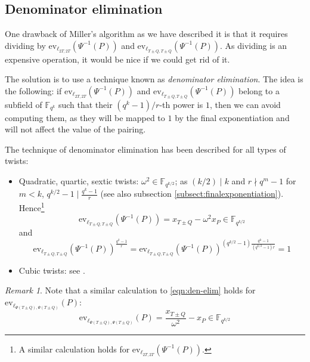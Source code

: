\documentclass{article}
\newcommand{\ev}{\mathrm{ev}}
\newcommand{\fq}[1]{\mathbb{F}_{q^{#1}}}
\theoremstyle{remark}
\newtheorem{remark}{Remark}[section]
\theoremstyle{plain}
\begin{document}
\subsection{Denominator elimination}

One drawback of Miller's algorithm as we have described it is that it requires dividing by $\ev_{\ell_{2T, 2T}}(\Psi^{-1}(P))$ and $\ev_{\ell_{T \pm Q, T \pm Q}}(\Psi^{-1}(P))$.
As dividing is an expensive operation, it would be nice if we could get rid of it.

The solution is to use a technique known as \emph{denominator elimination}.
The idea is the following: if $\ev_{\ell_{2T, 2T}}(\Psi^{-1}(P))$ and $\ev_{\ell_{T \pm Q, T \pm Q}}(\Psi^{-1}(P))$ belong to a subfield of $\fq{k}$ such that their $(q^k - 1)/r$-th power is $1$, then we can avoid computing them, as they will be mapped to $1$ by the final exponentiation and will not affect the value of the pairing.

The technique of denominator elimination has been described for all types of twists:
\begin{itemize}
    \item Quadratic, quartic, sextic twists: $\omega^2 \in \fq{k/2}$; as $(k/2) \mid k$ and $r \nmid q^m - 1$ for $m < k$, $q^{k/2} - 1 \mid \frac{q^k - 1}{r}$ (see also subsection \ref{subsect:finalexponentiation}). Hence\footnote{A similar calculation holds for $\ev_{\ell_{2T,2T}}(\Psi^{-1}(P))$.}
    \begin{equation}
        \label{eqn:den-elim}
        \ev_{\ell_{T \pm Q, T \pm Q}}(\Psi^{-1}(P)) = x_{T \pm Q} - \omega^2 x_P \in \fq{k/2}
    \end{equation}
    and
    \[
        \ev_{\ell_{T \pm Q, T \pm Q}}(\Psi^{-1}(P))^{\frac{q^k-1}{r}} = \ev_{\ell_{T \pm Q, T \pm Q}}(\Psi^{-1}(P))^{(q^{k/2}-1)\frac{q^k-1}{(q^{k/2}-1)r}} = 1
    \]
    \item Cubic twists: see \cite[Lem. 1]{LZZW-cubic-den-elim}.
\end{itemize}

\begin{remark}
    Note that a similar calculation to \eqref{eqn:den-elim} holds for $\ev_{\ell_{\Psi(T \pm Q), \Psi(T \pm Q)}}(P)$:
    \[
        \ev_{\ell_{\Psi(T \pm Q), \Psi(T \pm Q)}}(P) = \frac{x_{T \pm Q}}{\omega^2} - x_P \in \fq{k/2}
    \]
\end{remark}
\end{document}
